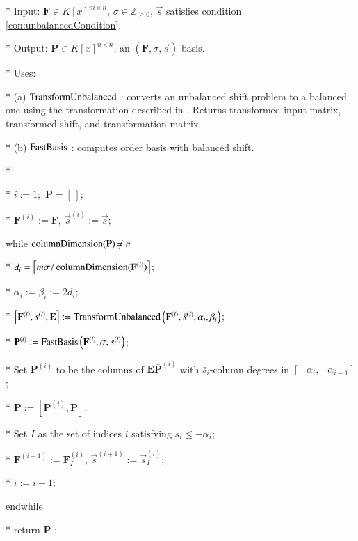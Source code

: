 %
\begin{algorithm}
\caption{$\umab\left(\mathbf{F},\sigma,\vec{s}\right)$ }


\label{alg:umab} 
\begin{algor}
\item [{{{*}}}] Input: $\mathbf{F}\in K\left[x\right]^{m\times n}$,
$\sigma\in\mathbb{Z}_{\ge0}$, $\vec{s}$ satisfies condition \eqref{con:unbalancedCondition}.
\item [{{{*}}}] Output: $\mathbf{P}\in K\left[x\right]^{n\times n}$,
an $\left(\mathbf{F},\sigma,\vec{s}\right)$-basis.
\item [{{{*}}}] Uses:
\item [{{*}}] (a) $\TransformUnbalanced$ : converts an unbalanced shift
problem to a balanced one using the transformation described in .
Returns transformed input matrix, transformed shift, and transformation
matrix.
\item [{{*}}] (b) %
$\mmab$ : computes order basis with balanced shift. 
\item [{{*}}]~\end{algor}
\begin{algor}[1]
\item [{{{*}}}]  $i:=1;$ $\mathbf{P}=[\,]$;
\item [{{{*}}}] $\mathbf{F}^{\left(i\right)}:=\mathbf{F}$, $\vec{s}^{\left(i\right)}:=\vec{s}$;
\item [{{while}}] $\columnDimension(\mathbf{P})\ne n$
\item [{{{*}}}] $d_{i}=\left\lceil m\sigma/\columnDimension(\mathbf{F}^{\left(i\right)})\right\rceil $;
\item [{{{*}}}] $\alpha_{i}:=\beta_{i}:=2d_{i};$
\item [{{{*}}}] $\left[\bar{\mathbf{F}}^{\left(i\right)},\bar{s}^{\left(i\right)},\mathbf{E}\right]:=\TransformUnbalanced\left(\mathbf{F}^{\left(i\right)},\vec{s}^{\left(i\right)},\alpha_{i},\beta_{i}\right)$;
\item [{{{*}}}] $\bar{\mathbf{P}}^{\left(i\right)}:=\mmab\left(\bar{\mathbf{F}}^{\left(i\right)},\sigma,\bar{s}^{\left(i\right)}\right)$;
\item [{{{*}}}] Set $\mathbf{P}^{\left(i\right)}$ to be the columns
of $\mathbf{E}\bar{\mathbf{P}}^{\left(i\right)}$ with $\bar{s}_{i}$-column
degrees in $[-\alpha_{i},-\alpha_{i-1}]$;
\item [{{{*}}}] $\mathbf{P}:=\left[\mathbf{P}^{\left(i\right)},\mathbf{P}\right]$;
\item [{{{*}}}] Set $I$ as the set of indices $i$ satisfying $s_{i}\le-\alpha_{i}$;
\item [{{{*}}}] $\mathbf{F}^{\left(i+1\right)}:=\mathbf{F}_{I}^{\left(i\right)}$,
$\vec{s}^{\left(i+1\right)}:=\vec{s}_{I}^{\left(i\right)}$;
\item [{{{*}}}] $i:=i+1$;
\item [{{endwhile}}] ~
\item [{{{*}}}] return $\mathbf{P}$ ; 
\end{algor}

\end{algorithm}

